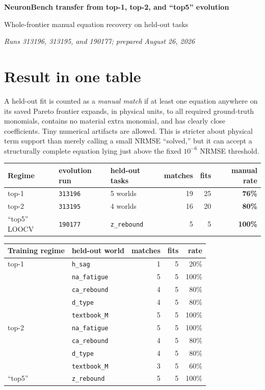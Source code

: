 \documentclass[10pt]{article}
\newcommand{\code}[1]{\nolinkurl{#1}}
\begin{document}
{\LARGE\bfseries\color{navy} NeuronBench transfer from top-1, top-2, and ``top5'' evolution}

\vspace{3pt}
{\large Whole-frontier manual equation recovery on held-out tasks}

\vspace{5pt}
\textit{Runs 313196, 313195, and 190177; prepared August 26, 2026}

\section*{Result in one table}

A held-out fit is counted as a \emph{manual match} if at least one equation anywhere on its saved
Pareto frontier expands, in physical units, to all required ground-truth monomials, contains no
material extra monomial, and has clearly close coefficients.  Tiny numerical artifacts are
allowed.  This is stricter about physical term support than merely calling a small NRMSE
``solved,'' but it can accept a structurally complete equation lying just above the fixed
$10^{-6}$ NRMSE threshold.

\begin{center}
\begin{tabular}{@{}lllrrr@{}}
\toprule
Regime & evolution run & held-out tasks & matches & fits & manual rate \\
\midrule
top-1 & \code{313196} & 5 worlds & 19 & 25 & \textbf{76\%} \\
top-2 & \code{313195} & 4 worlds & 16 & 20 & \textbf{80\%} \\
``top5'' LOOCV & \code{190177} & \code{z_rebound} & 5 & 5 & \textbf{100\%} \\
\bottomrule
\end{tabular}
\end{center}

\begin{center}
\begin{tabular}{@{}llrrr@{}}
\toprule
Training regime & held-out world & matches & fits & rate \\
\midrule
top-1 & \code{h_sag}       & 1 & 5 & 20\% \\
      & \code{na_fatigue}  & 5 & 5 & 100\% \\
      & \code{ca_rebound}  & 4 & 5 & 80\% \\
      & \code{d_type}      & 4 & 5 & 80\% \\
      & \code{textbook_M}  & 5 & 5 & 100\% \\
\addlinespace
top-2 & \code{na_fatigue}  & 5 & 5 & 100\% \\
      & \code{ca_rebound}  & 4 & 5 & 80\% \\
      & \code{d_type}      & 4 & 5 & 80\% \\
      & \code{textbook_M}  & 3 & 5 & 60\% \\
\addlinespace
``top5'' & \code{z_rebound} & 5 & 5 & 100\% \\
\bottomrule
\end{tabular}
\end{center}
\end{document}
